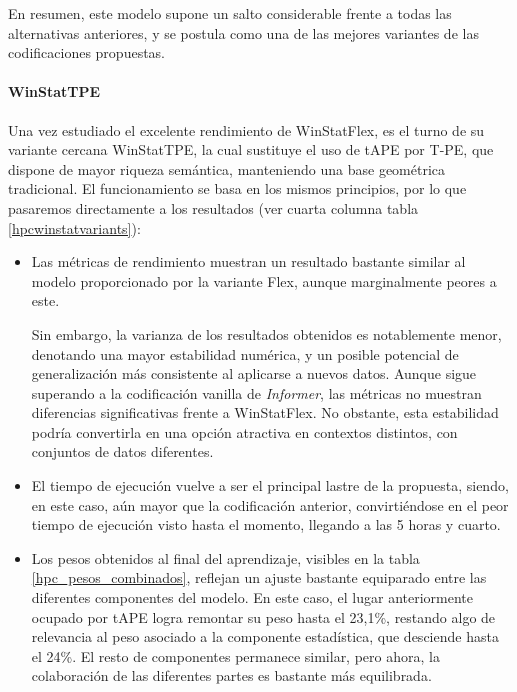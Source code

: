 En resumen, este modelo supone un salto considerable frente a todas las alternativas anteriores, y se postula como una de las mejores variantes de las codificaciones propuestas.

\paragraph{WinStatTPE}

Una vez estudiado el excelente rendimiento de WinStatFlex, es el turno de su variante cercana WinStatTPE, la cual sustituye el uso de tAPE por T-PE, que dispone de mayor riqueza semántica, manteniendo una base geométrica tradicional. El funcionamiento se basa en los mismos principios, por lo que pasaremos directamente a los resultados (ver cuarta columna tabla \ref{hpcwinstatvariants}):

\begin{itemize}
	\item Las métricas de rendimiento muestran un resultado bastante similar al modelo proporcionado por la variante Flex, aunque marginalmente peores a este. 
	
	Sin embargo, la varianza de los resultados obtenidos es notablemente menor, denotando una mayor estabilidad numérica, y un posible potencial de generalización más consistente al aplicarse a nuevos datos. Aunque sigue superando a la codificación vanilla de \textit{Informer}, las métricas no muestran diferencias significativas frente a WinStatFlex. No obstante, esta estabilidad podría convertirla en una opción atractiva en contextos distintos, con conjuntos de datos diferentes.
	
	\item El tiempo de ejecución vuelve a ser el principal lastre de la propuesta, siendo, en este caso, aún mayor que la codificación anterior, convirtiéndose en el peor tiempo de ejecución visto hasta el momento, llegando a las 5 horas y cuarto.
	
	\item Los pesos obtenidos al final del aprendizaje, visibles en la tabla \ref{hpc_pesos_combinados}, reflejan un ajuste bastante equiparado entre las diferentes componentes del modelo. En este caso, el lugar anteriormente ocupado por tAPE logra remontar su peso hasta el 23,1\%, restando algo de relevancia al peso asociado a la componente estadística, que desciende hasta el 24\%. El resto de componentes permanece similar, pero ahora, la colaboración de las diferentes partes es bastante más equilibrada.
\end{itemize}

